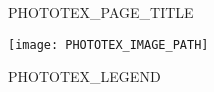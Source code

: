 PHOTOTEX_PAGE_TITLE
\begin{minipage}[t][0.025\textheight][t]{\textwidth}
  \hfill\vfill
\end{minipage}
\begin{minipage}[t][0.90\textheight][t]{\textwidth}
  \begin{center}
    \texttt{[image: PHOTOTEX\_IMAGE\_PATH]}\\[1em]
  \end{center}
\end{minipage}
\begin{minipage}[t][0.03\textheight][t]{\textwidth}
  \begin{center}
    PHOTOTEX_LEGEND\\[1em]
  \end{center}
\end{minipage}

\clearpage
